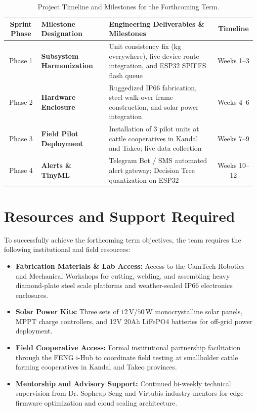 \documentclass[11pt,a4paper]{report}
\begin{document}
\begin{table}[htbp]
    \centering
    \caption{Project Timeline and Milestones for the Forthcoming Term.}
    \label{tab:next_term_timeline}
    \vspace{0.2cm}
    \begin{tabularx}{\textwidth}{|c|>{\bfseries}p{3.8cm}|X|c|}
        \hline
        \rowcolor{tableShade}
        Sprint Phase & Milestone Designation & Engineering Deliverables \& Milestones & Timeline \\ \hline
        Phase 1 & Subsystem Harmonization & Unit consistency fix (kg everywhere), live device route integration, and ESP32 SPIFFS flash queue & Weeks 1--3 \\ \hline
        Phase 2 & Hardware Enclosure & Ruggedized IP66 fabrication, steel walk-over frame construction, and solar power integration & Weeks 4--6 \\ \hline
        Phase 3 & Field Pilot Deployment & Installation of 3 pilot units at cattle cooperatives in Kandal and Takeo; live data collection & Weeks 7--9 \\ \hline
        Phase 4 & Alerts \& TinyML & Telegram Bot / SMS automated alert gateway; Decision Tree quantization on ESP32 & Weeks 10--12 \\ \hline
    \end{tabularx}
\end{table}

\section{Resources and Support Required}
To successfully achieve the forthcoming term objectives, the team requires the following institutional and field resources:
\begin{itemize}
    \item \textbf{Fabrication Materials \& Lab Access:} Access to the CamTech Robotics and Mechanical Workshops for cutting, welding, and assembling heavy diamond-plate steel scale platforms and weather-sealed IP66 electronics enclosures.
    \item \textbf{Solar Power Kits:} Three sets of $12\,\text{V} / 50\,\text{W}$ monocrystalline solar panels, MPPT charge controllers, and 12V 20Ah LiFePO4 batteries for off-grid power deployment.
    \item \textbf{Field Cooperative Access:} Formal institutional partnership facilitation through the FENG i-Hub to coordinate field testing at smallholder cattle farming cooperatives in Kandal and Takeo provinces.
    \item \textbf{Mentorship and Advisory Support:} Continued bi-weekly technical supervision from Dr. Sopheap Seng and Virtubis industry mentors for edge firmware optimization and cloud scaling architecture.
\end{itemize}
\end{document}
